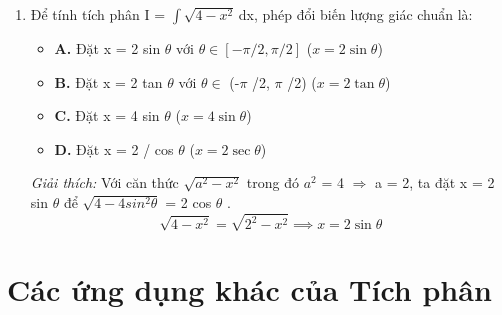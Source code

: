 \documentclass[11pt,a4paper,oneside]{book}
\begin{document}
\begin{enumerate}[label=\textbf{Câu \arabic*:}, leftmargin=2.2em, itemsep=8pt]
  \[ p = \frac{3}{2} > 1 \implies \int_1^{+\infty} x^{-3/2}\,dx = \Big[-2x^{-1/2}\Big]_1^{+\infty} = 2 \]
  \item Để tính tích phân I = $\int \sqrt{4 - x^2}$\,dx, phép đổi biến lượng giác chuẩn là:
  \begin{itemize}[label={}, leftmargin=1em, itemsep=2pt]
    \item \textbf{A.} Đặt x = 2 sin $\theta$  với $\theta \in  [-\pi /2, \pi /2]$ \quad ($x = 2\sin\theta$)
    \item \textbf{B.} Đặt x = 2 tan $\theta$  với $\theta \in$  (-$\pi$ /2, $\pi$ /2) \quad ($x = 2\tan\theta$)
    \item \textbf{C.} Đặt x = 4 sin $\theta$  \quad ($x = 4\sin\theta$)
    \item \textbf{D.} Đặt x = 2 / cos $\theta$  \quad ($x = 2\sec\theta$)
  \end{itemize}
  \vspace{2pt}
   \textit{Giải thích:} Với căn thức $\sqrt{a^2 - x^2}$ trong đó $a^2$ = 4 $\Rightarrow$  a = 2, ta đặt x = 2 sin $\theta$  để $\sqrt{4 - 4sin^2 \theta }$ = 2 cos $\theta$ .
  \[ \sqrt{4 - x^2} = \sqrt{2^2 - x^2} \implies x = 2\sin\theta \]
\end{enumerate}

\chapter{Các ứng dụng khác của Tích phân}
\label{chap:chuong-8}
\end{document}
